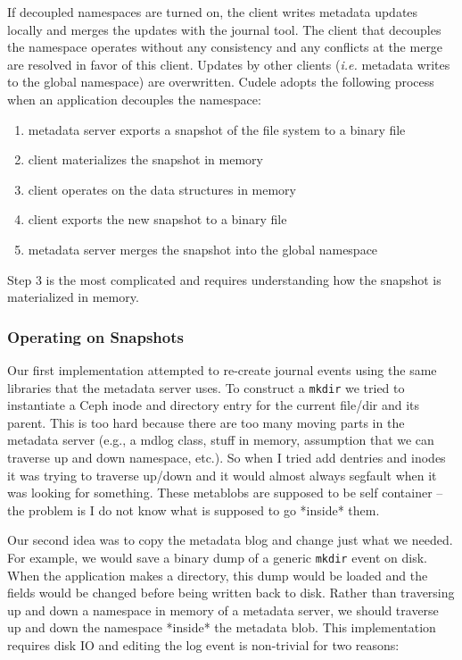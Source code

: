 \documentclass[preprint]{sigplanconf-eurosys}
\begin{document}
If decoupled namespaces are turned on, the client writes metadata updates
locally and merges the updates with the journal tool. The client that decouples
the namespace operates without any consistency and any conflicts at the merge
are resolved in favor of this client. Updates by other clients ({\it i.e.}
metadata writes to the global namespace) are overwritten. Cudele adopts the
following process when an application decouples the namespace:

\begin{enumerate}
  \item metadata server exports a snapshot of the file system to a binary file
  \item client materializes the snapshot in memory
  \item client operates on the data structures in memory
  \item client exports the new snapshot to a binary file
  \item metadata server merges the snapshot into the global namespace
\end{enumerate}

Step 3 is the most complicated and requires understanding how the snapshot is
materialized in memory. 

\subsubsection{Operating on Snapshots} 

Our first implementation attempted to re-create journal events using the same
libraries that the metadata server uses. To construct a \texttt{mkdir} we tried
to instantiate a Ceph inode and directory entry for the current file/dir and
its parent.  This is too hard because there are too many moving parts in the
metadata server (e.g., a mdlog class, stuff in memory, assumption that we can
traverse up and down namespace, etc.). So when I tried add dentries and inodes
it was trying to traverse up/down and it would almost always segfault when it
was looking for something. These metablobs are supposed to be self container --
the problem is I do not know what is supposed to go *inside* them. 

Our second idea was to copy the metadata blog and change just what we needed.
For example, we would save a binary dump of a generic \texttt{mkdir} event on
disk. When the application makes a directory, this dump would be loaded and the
fields would be changed before being written back to disk. Rather than
traversing up and down a namespace in memory of a metadata server, we should
traverse up and down the namespace *inside* the metadata blob. This
implementation requires disk IO and editing the log event is non-trivial for
two reasons:
\end{document}

